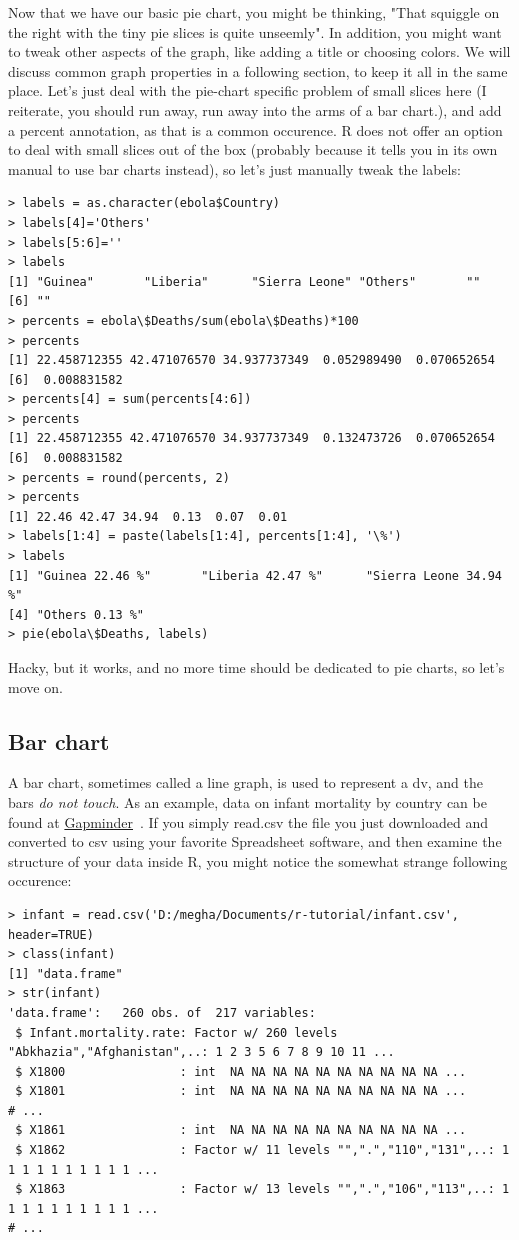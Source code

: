 \documentclass{report}
\newcommand{\code}[1]{\textsf{\ttfamily #1}}
\begin{document}
		Now that we have our basic pie chart, you might be thinking, "That squiggle on the right with the tiny pie slices is quite unseemly". In addition, you might want to tweak other aspects of the graph, like adding a title or choosing colors. We will discuss common graph properties in a following section, to keep it all in the same place. Let's just deal with the pie-chart specific problem of small slices here (I reiterate, you should run away, run away into the arms of a bar chart.), and add a percent annotation, as that is a common occurence. R does not offer an option to deal with small slices out of the box (probably because it tells you in its own manual to use bar charts instead), so let's just manually tweak the labels:
		\begin{verbatim}
> labels = as.character(ebola$Country)
> labels[4]='Others'
> labels[5:6]=''
> labels
[1] "Guinea"       "Liberia"      "Sierra Leone" "Others"       ""            
[6] ""
> percents = ebola\$Deaths/sum(ebola\$Deaths)*100
> percents
[1] 22.458712355 42.471076570 34.937737349  0.052989490  0.070652654
[6]  0.008831582
> percents[4] = sum(percents[4:6])
> percents
[1] 22.458712355 42.471076570 34.937737349  0.132473726  0.070652654
[6]  0.008831582
> percents = round(percents, 2)
> percents
[1] 22.46 42.47 34.94  0.13  0.07  0.01
> labels[1:4] = paste(labels[1:4], percents[1:4], '\%')
> labels
[1] "Guinea 22.46 %"       "Liberia 42.47 %"      "Sierra Leone 34.94 %"
[4] "Others 0.13 %"
> pie(ebola\$Deaths, labels)
		\end{verbatim}
		Hacky, but it works, and no more time should be dedicated to pie charts, so let's move on.

		\subsection{Bar chart}
	A bar chart, sometimes called a line graph, is used to represent a \gls{dv}, and the bars \emph{do not touch}. As an example, data on infant mortality by country can be found at \href{https://docs.google.com/spreadsheets/d/1OHMMuHbSFKDolNHXsmgHYlkjSKfAZyyY1P-ddMu_Fz0/pub}{Gapminder}~\cite{gapminder}. If you simply \code{read.csv} the file you just downloaded and converted to csv using your favorite Spreadsheet software, and then examine the structure of your data inside R, you might notice the somewhat strange following occurence:
	\begin{verbatim}
> infant = read.csv('D:/megha/Documents/r-tutorial/infant.csv', header=TRUE)
> class(infant)
[1] "data.frame"
> str(infant)
'data.frame':   260 obs. of  217 variables:
 $ Infant.mortality.rate: Factor w/ 260 levels "Abkhazia","Afghanistan",..: 1 2 3 5 6 7 8 9 10 11 ...
 $ X1800                : int  NA NA NA NA NA NA NA NA NA NA ...
 $ X1801                : int  NA NA NA NA NA NA NA NA NA NA ...
# ...
 $ X1861                : int  NA NA NA NA NA NA NA NA NA NA ...
 $ X1862                : Factor w/ 11 levels "",".","110","131",..: 1 1 1 1 1 1 1 1 1 1 ...
 $ X1863                : Factor w/ 13 levels "",".","106","113",..: 1 1 1 1 1 1 1 1 1 1 ...
# ... 
	\end{verbatim}
\end{document}
